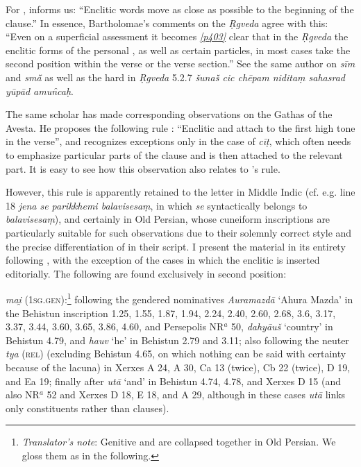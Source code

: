 For  , \citet[47]{Delbrueck1878} informs us: ``Enclitic words move as close as possible to the beginning of the clause.'' In essence, Bartholomae's \citeyearpar[3]{Bartholomae1886} comments on the \textit{\d{R}gveda} agree with this: ``Even on a superficial assessment it becomes \hyperlink{p403}{\emph{[p403]}} clear that in the \textit{\d{R}gveda} the enclitic forms of the personal , as well as certain particles, in most cases take the second position within the verse or the verse section.'' See the same author \citeyearpar[30]{Bartholomae1887} on \emph{sīm} and \emph{smā̆} as well as the hard  in \textit{\d{R}gveda} 5.2.7 \emph{ṧunaṧ cic chēpam niditaṃ sahasrad yūpād amun̑caḥ}.

The same scholar \citeyearpar[3--31]{Bartholomae1886} has made corresponding observations on the Gathas of the Avesta. He proposes the following rule \citeyearpar[11ff.]{Bartholomae1886}: ``Enclitic  and  attach to the first high tone in the verse'', and recognizes exceptions only in the case of \emph{cīṭ}\label{cit}, which often needs to emphasize particular parts of the clause and is then attached to the relevant part. It is easy to see how this observation also relates to \citeauthor{Delbrueck1878}'s rule.

However, this rule is apparently retained to the letter in Middle Indic  (cf. e.g. \citealp[8]{Jacobi1886} line 18 \emph{jena se parikkhemi balavisesaṃ}, in which \emph{se} syntactically belongs to \emph{balavisesaṃ}), and certainly in Old Persian, whose cuneiform inscriptions are particularly suitable for such observations due to their solemnly correct style and the precise differentiation of  in their script. I present the material in its entirety following \citet{Spiegel1881}, with the exception of the cases in which the enclitic is inserted editorially. The following are found exclusively in second position:

\emph{mai̯} (\textsc{1sg.gen}):\footnote{\emph{Translator's note}: Genitive and  are collapsed together in Old Persian. We gloss them as  in the following.} following the gendered nominatives \emph{Auramazdā} `Ahura Mazda' in the Behistun inscription 1.25, 1.55, 1.87, 1.94, 2.24, 2.40, 2.60, 2.68, 3.6, 3.17, 3.37, 3.44, 3.60, 3.65, 3.86, 4.60, and Persepolis NR$^a$ 50, \emph{dahyāuš} `country' in Behistun 4.79, and \emph{hauv} `he' in Behistun 2.79 and 3.11; also following the neuter \emph{tya} (\textsc{rel}) (excluding Behistun 4.65, on which nothing can be said with certainty because of the lacuna) in Xerxes A 24, A 30, Ca 13 (twice), Cb 22 (twice), D 19, and Ea 19; finally after \emph{utā} `and' in Behistun 4.74, 4.78, and Xerxes D 15 (and also NR$^a$ 52 and Xerxes D 18, E 18, and A 29, although in these cases \emph{utā} links only constituents rather than clauses).


